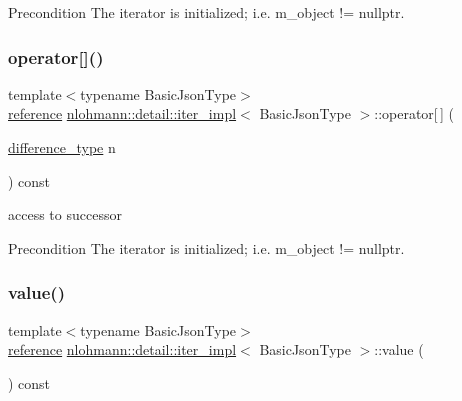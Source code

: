 \begin{DoxyPrecond}{Precondition}
The iterator is initialized; i.\+e. {\ttfamily m\+\_\+object != nullptr}. 
\end{DoxyPrecond}
\mbox{\label{classnlohmann_1_1detail_1_1iter__impl_ac0b9276f1102ed4b9cd3f5f56287e3ce}} 
\subsubsection{\texorpdfstring{operator[]()}{operator[]()}}
{\footnotesize\ttfamily template$<$typename Basic\+Json\+Type$>$ \\
\mbox{\hyperlink{classnlohmann_1_1detail_1_1iter__impl_a5be8001be099c6b82310f4d387b953ce}{reference}} \mbox{\hyperlink{classnlohmann_1_1detail_1_1iter__impl}{nlohmann\+::detail\+::iter\+\_\+impl}}$<$ Basic\+Json\+Type $>$\+::operator\mbox{[}$\,$\mbox{]} (\begin{DoxyParamCaption}\item[{\mbox{\hyperlink{classnlohmann_1_1detail_1_1iter__impl_a2f7ea9f7022850809c60fc3263775840}{difference\+\_\+type}}}]{n }\end{DoxyParamCaption}) const\hspace{0.3cm}{\ttfamily [inline]}}



access to successor 

\begin{DoxyPrecond}{Precondition}
The iterator is initialized; i.\+e. {\ttfamily m\+\_\+object != nullptr}. 
\end{DoxyPrecond}
\mbox{\label{classnlohmann_1_1detail_1_1iter__impl_ab447c50354c6611fa2ae0100ac17845c}} 
\subsubsection{\texorpdfstring{value()}{value()}}
{\footnotesize\ttfamily template$<$typename Basic\+Json\+Type$>$ \\
\mbox{\hyperlink{classnlohmann_1_1detail_1_1iter__impl_a5be8001be099c6b82310f4d387b953ce}{reference}} \mbox{\hyperlink{classnlohmann_1_1detail_1_1iter__impl}{nlohmann\+::detail\+::iter\+\_\+impl}}$<$ Basic\+Json\+Type $>$\+::value (\begin{DoxyParamCaption}{ }\end{DoxyParamCaption}) const\hspace{0.3cm}{\ttfamily [inline]}}



